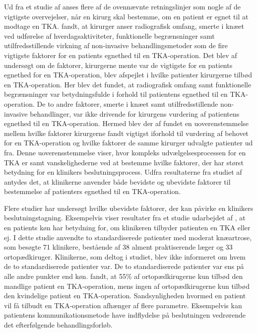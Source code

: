 Ud fra et studie af  anses flere af de ovennævnte retningslinjer som nogle af de vigtigste overvejelser, når en kirurg skal bestemme, om en patient er egnet til at modtage en TKA.  fandt, at kirurger anser radiografisk omfang, smerte i knæet ved udførelse af hverdagsaktiviteter, funktionelle begrænsninger samt utilfredsstillende virkning af non-invasive behandlingsmetoder som de fire vigtigste faktorer for en patients egnethed til en TKA-operation. Det blev af  undersøgt om de faktorer, kirurgerne mente var de vigtigste for en patients egnethed for en TKA-operation, blev afspejlet i hvilke patienter kirurgerne tilbød en TKA-operation. Her blev det fundet, at radiografisk omfang samt funktionelle begrænsninger var betydningsfulde i forhold til patientens egnethed til en TKA-operation. De to andre faktorer, smerte i knæet samt utilfredsstillende non-invasive behandlinger, var ikke drivende for kirurgens vurdering af patientens egnethed til en TKA-operation. Hermed blev der af  fundet en uoverenstemmelse mellem hvilke faktorer kirurgerne fandt vigtigst iforhold til vurdering af behovet for en TKA-operation og hvilke faktorer de samme kirurger udvalgte patienter ud fra. Denne uoverensstemmelse viser, hvor kompleks udvælgelsesprocessen for en TKA er samt vanskelighederne ved at bestemme hvilke faktorer, der har størst betydning for en klinikers beslutningsprocess. Udfra resultaterne fra studiet af  antydes det, at klinikerne anvender både bevidste og ubevidste faktorer til bestemmelse af patienters egnethed til en TKA-operation.    


Flere studier har undersøgt hvilke ubevidste faktorer, der kan påvirke en klinikers beslutningstagning. Eksempelvis viser resultater fra et studie udarbejdet af , at en patients køn har betydning for, om klinikeren tilbyder patienten en TKA eller ej. I dette studie anvendte  to standardiserede patienter med moderat knæartrose, som besøgte 71 klinikere, bestående af 38 alment praktiserende læger og 33 ortopædkiruger. Klinikerne, som deltog i studiet, blev ikke informeret om hvem de to standardiserede patienter var. De to standardiserede patienter var ens på alle andre punkter end køn.  fandt, at 55\% af ortopædkirugerne  kun tilbød den mandlige patient en TKA-operation, mens ingen af ortopædkirugerne  kun tilbød den kvindelige patient en TKA-operation. Sandsynligheden hvormed en patient vil få tilbudt en TKA-operation afhænger af flere parametre. Eksempelvis kan patientens kommunikationsmetode have indflydelse på beslutningen vedrørende det efterfølgende behandlingsforløb. \citep{borkhoff2008}

